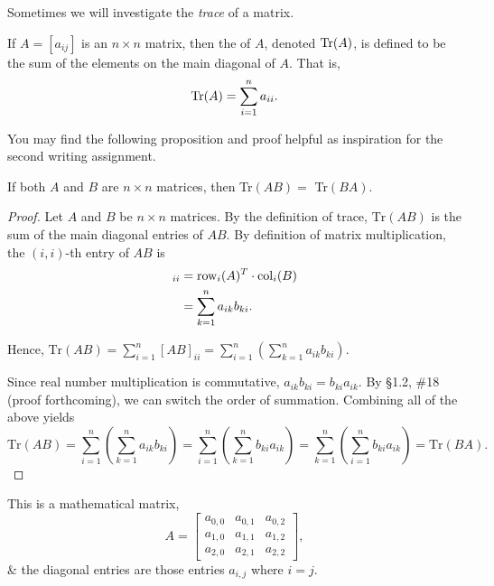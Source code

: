\documentclass{article}
\begin{document}
\clearpage

Sometimes we will investigate the \textit{trace} of a matrix.

\begin{defn*} 
    If $A = [a_{ij}]$ is an $n \times n$ matrix, then the  of $A$, denoted $\operatorname{Tr}(A)$, is defined to be the sum of the elements on the main diagonal of $A$.  That is, 
    \[
        \operatorname{Tr}(A) = \sum_{i = 1}^n a_{ii}.
    \]
\end{defn*}

You may find the following proposition and proof helpful as inspiration for the second writing assignment.

\begin{prop*}[\S1.3, \#43c]  
    If both $A$ and $B$ are $n \times n$ matrices, then Tr$(AB) =$ Tr$(BA)$.
\end{prop*}

\begin{proof} 
    Let $A$ and $B$ be $n \times n$ matrices. 
    By the definition of trace, $\text{Tr}(AB)$ is the sum of the main diagonal entries of $AB$. By definition of matrix multiplication, the $(i,i)$-th entry of $AB$ is 
    \begin{align*}
        [AB]_{ii} &= \Row_i(A)^T\cdot \Col_i(B) \\ &= \sum_{k=1}^{n} a_{ik} b_{ki}.
    \end{align*}

    Hence, $\text{Tr}(AB) = \sum_{i=1}^n [AB]_{ii} =\sum_{i=1}^n \left( \sum_{k=1}^n a_{ik} b_{ki} \right)$.
    
    Since real number multiplication is commutative, $a_{ik} b_{ki} = b_{ki} a_{ik}$.  By \S1.2, \#18 (proof forthcoming), we can switch the order of summation.  Combining all of the above yields
    \[
        \text{Tr}(AB)
        = \sum_{i=1}^n \left( \sum_{k=1}^n a_{ik} b_{ki} \right) 
        = \sum_{i=1}^n \left( \sum_{k=1}^n b_{ki} a_{ik} \right) 
        = \sum_{k=1}^n \left( \sum_{i=1}^n b_{ki} a_{ik} \right) 
        = \text{Tr}(BA). 
    \]
\end{proof}


\begin{example*}[p 314] 
    This is a mathematical matrix,
    \[ A = \begin{bmatrix}
    a_{0,0} & a_{0,1} & a_{0,2} \\
    a_{1,0} & a_{1,1} & a_{1,2} \\
    a_{2,0} & a_{2,1} & a_{2,2}
    \end{bmatrix},
    \] \& the diagonal entries are those entries $a_{i,j}$ where $i = j$.
\end{example*}
\end{document}
